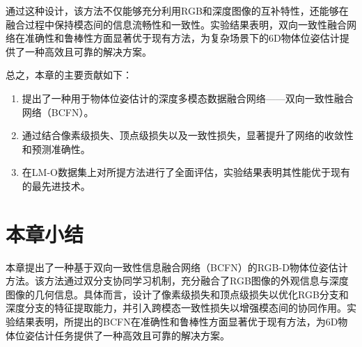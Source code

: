 通过这种设计，该方法不仅能够充分利用RGB和深度图像的互补特性，还能够在融合过程中保持模态间的信息流畅性和一致性。实验结果表明，双向一致性融合网络在准确性和鲁棒性方面显著优于现有方法，为复杂场景下的6D物体位姿估计提供了一种高效且可靠的解决方案。

总之，本章的主要贡献如下：
\begin{enumerate}
\item 提出了一种用于物体位姿估计的深度多模态数据融合网络——双向一致性融合网络（BCFN）。
\item 通过结合像素级损失、顶点级损失以及一致性损失，显著提升了网络的收敛性和预测准确性。
\item 在LM-O数据集上对所提方法进行了全面评估，实验结果表明其性能优于现有的最先进技术。
\end{enumerate}


\section{本章小结}
本章提出了一种基于双向一致性信息融合网络（BCFN）的RGB-D物体位姿估计方法。该方法通过双分支协同学习机制，充分融合了RGB图像的外观信息与深度图像的几何信息。具体而言，设计了像素级损失和顶点级损失以优化RGB分支和深度分支的特征提取能力，并引入跨模态一致性损失以增强模态间的协同作用。实验结果表明，所提出的BCFN在准确性和鲁棒性方面显著优于现有方法，为6D物体位姿估计任务提供了一种高效且可靠的解决方案。